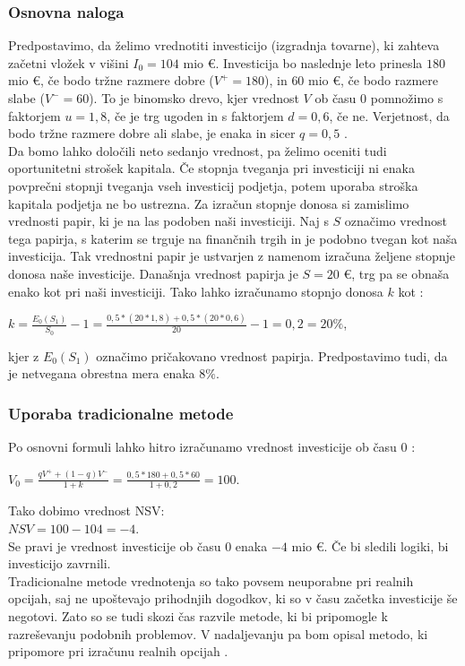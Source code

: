 \subsubsection{Osnovna naloga}
Predpostavimo, da želimo vrednotiti investicijo (izgradnja tovarne), ki zahteva začetni vložek v višini $I_0= 104$ mio €. Investicija bo naslednje leto prinesla $180$ mio €, če bodo tržne razmere dobre ($V^+=180$), in $60$ mio €, če bodo razmere slabe ($V^-=60$). To je binomsko drevo, kjer vrednost $V$ ob času 0 pomnožimo s faktorjem $u=1,8$, če je trg ugoden in s faktorjem $d=0,6$, če ne. Verjetnost, da bodo tržne razmere dobre ali slabe, je enaka in sicer $q=0,5$ \cite[str. 153]{Trigeorgis}. \\
Da bomo lahko določili neto sedanjo vrednost, pa želimo oceniti tudi oportunitetni strošek kapitala. Če stopnja tveganja pri investiciji ni enaka povprečni stopnji tveganja vseh investicij podjetja, potem uporaba stroška kapitala podjetja ne bo ustrezna. Za izračun stopnje donosa si zamislimo vrednosti papir, ki je na las podoben naši investiciji. Naj s $S$ označimo vrednost tega papirja, s katerim se trguje na finančnih trgih in je podobno tvegan kot naša investicija. Tak vrednostni papir je ustvarjen z namenom izračuna željene stopnje donosa naše investicije. Današnja vrednost papirja je $S=20$ €, trg pa se obnaša enako kot pri naši investiciji. Tako lahko izračunamo stopnjo donosa $k$ kot \cite[str. 153, 154]{Trigeorgis}:
\begin{center}
$k = \tfrac{E_0(S_1)}{S_0}-1= \tfrac{0,5 * (20*1,8)+0,5*(20*0,6)}{20}-1= 0,2 = 20 \%$,
\end{center}
kjer z $E_0(S_1)$ označimo pričakovano vrednost papirja. Predpostavimo tudi, da je netvegana obrestna mera enaka $8 \%$.\\

\subsubsection{Uporaba tradicionalne metode}
Po osnovni formuli lahko hitro izračunamo vrednost investicije ob času 0 \cite[str. 154]{Trigeorgis}:
\begin{center}
$V_0 = \tfrac{qV^+  + (1-q)V^-}{1+k}= \tfrac{0,5 * 180+0,5*60}{1+0,2}= 100$.
\end{center}
Tako dobimo vrednost NSV:\\
$NSV = 100 - 104 = -4$.\\
Se pravi je vrednost investicije ob času 0 enaka $-4$ mio €. Če bi sledili logiki, bi investicijo zavrnili.\\
Tradicionalne metode vrednotenja so tako povsem neuporabne pri realnih opcijah, saj ne upoštevajo prihodnjih dogodkov, ki so v času začetka investicije še negotovi. Zato so se tudi skozi čas razvile metode, ki bi pripomogle k razreševanju podobnih problemov. V nadaljevanju pa bom opisal metodo, ki pripomore pri izračunu realnih opcijah \cite[str. 154]{Trigeorgis}.\\

